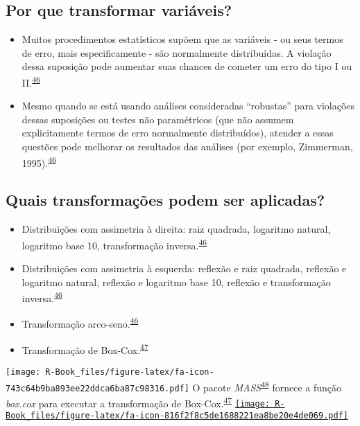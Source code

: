 \documentclass[
]{book}
\begin{document}
\hypertarget{por-que-transformar-variuxe1veis}{%
\subsection{Por que transformar variáveis?}\label{por-que-transformar-variuxe1veis}}

\begin{itemize}
\item
  Muitos procedimentos estatísticos supõem que as variáveis - ou seus termos de erro, mais especificamente - são normalmente distribuídas. A violação dessa suposição pode aumentar suas chances de cometer um erro do tipo I ou II.\textsuperscript{\protect\hyperlink{ref-osborne2010}{46}}
\item
  Mesmo quando se está usando análises consideradas ``robustas'' para violações dessas suposições ou testes não paramétricos (que não assumem explicitamente termos de erro normalmente distribuídos), atender a essas questões pode melhorar os resultados das análises (por exemplo, Zimmerman, 1995).\textsuperscript{\protect\hyperlink{ref-osborne2010}{46}}
\end{itemize}

\hypertarget{quais-transformauxe7uxf5es-podem-ser-aplicadas}{%
\subsection{Quais transformações podem ser aplicadas?}\label{quais-transformauxe7uxf5es-podem-ser-aplicadas}}

\begin{itemize}
\item
  Distribuições com assimetria à direita: raiz quadrada, logaritmo natural, logaritmo base 10, transformação inversa.\textsuperscript{\protect\hyperlink{ref-osborne2010}{46}}
\item
  Distribuições com assimetria à esquerda: reflexão e raiz quadrada, reflexão e logaritmo natural, reflexão e logaritmo base 10, reflexão e transformação inversa.\textsuperscript{\protect\hyperlink{ref-osborne2010}{46}}
\item
  Transformação arco-seno.\textsuperscript{\protect\hyperlink{ref-osborne2010}{46}}
\item
  Transformação de Box-Cox.\textsuperscript{\protect\hyperlink{ref-box1964}{47}}
\end{itemize}

\texttt{[image: R-Book\_files/figure-latex/fa-icon-743c64b9ba893ee22ddca6ba87c98316.pdf]} O pacote \emph{MASS}\textsuperscript{\protect\hyperlink{ref-MASS}{48}} fornece a função \emph{box.cox} para executar a transformação de Box-Cox.\textsuperscript{\protect\hyperlink{ref-box1964}{47}} \href{https://cran.r-project.org/web/packages/MASS/index.html}{\texttt{[image: R-Book\_files/figure-latex/fa-icon-816f2f8c5de1688221ea8be20e4de069.pdf]}}
\end{document}
